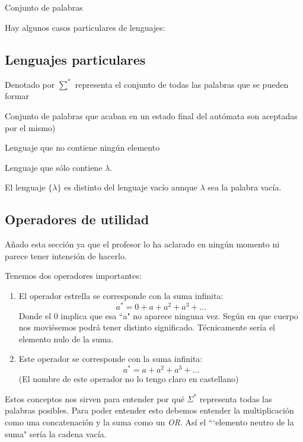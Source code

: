 \documentclass{apuntes}
\begin{document}
\begin{defn}[Lenguaje]
Conjunto de palabras
\end{defn}

Hay algunos casos particulares de lenguajes:
\subsection{Lenguajes particulares}
\begin{defn}
Denotado por $\sum^*$ representa el conjunto de todas las palabras que se pueden formar
\end{defn}

\begin{defn}
Conjunto de palabras que acaban en un estado final del autómata son aceptadas por el mismo)
\end{defn}

\begin{defn}
Lenguaje que no contiene ningún elemento
\end{defn}

\begin{defn}
Lenguaje que sólo contiene $\lambda$.
\end{defn}
El lenguaje $\lbrace \lambda \rbrace$ es distinto del lenguaje vacío aunque $\lambda$ sea la palabra vacía.

\subsection{Operadores de utilidad}
Añado esta sección ya que el profesor lo ha aclarado en ningún momento ni parece tener intención de hacerlo.

Tenemos dos operadores importantes:
\begin{enumerate}
\item \begin{defn}[Estrella]
El operador estrella se corresponde con la suma infinita:
\[a^* = 0 + a + a^2 + a^3 + ...\]
Donde el 0 implica que esa ``a" no aparece ninguna vez. Según en que cuerpo nos moviésemos podrá tener distinto significado. Técnicamente sería el elemento nulo de la suma.
\end{defn}
\item \begin{defn}[Suma]
Este operador se corresponde con la suma infinita:
\[a^* = a + a^2 + a^3 + ...\]
(El nombre de este operador no lo tengo claro en castellano)
\end{defn}
\end{enumerate}
Estos conceptos nos sirven para entender por qué $\Sigma ^*$  representa todas las palabras posibles. Para poder entender esto debemos entender la multiplicación como una concatenación y la suma como un \textit{OR}. Así el ```elemento neutro de la suma" sería la cadena vacía.
\end{document}
